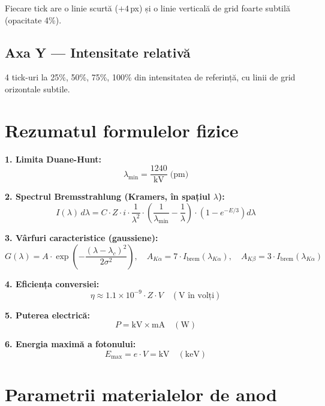 \documentclass[12pt,a4paper]{article}
\begin{document}
Fiecare tick are o linie scurtă ($+4$\,px) și o linie verticală de grid foarte subtilă (opacitate 4\%).

\subsection{Axa Y — Intensitate relativă}

4 tick-uri la 25\%, 50\%, 75\%, 100\% din intensitatea de referință, cu linii de grid orizontale subtile.


\section{Rezumatul formulelor fizice}

\begin{tcolorbox}[colback=codeblue!5, colframe=codeblue, title=Formulele cheie ale simulatorului]

\textbf{1. Limita Duane-Hunt:}
\[
    \lambda_{\min} = \frac{1240}{\text{kV}} \;\text{(pm)}
\]

\textbf{2. Spectrul Bremsstrahlung (Kramers, în spațiul $\lambda$):}
\[
    I(\lambda)\,d\lambda = C \cdot Z \cdot i \cdot \frac{1}{\lambda^2} \cdot \left(\frac{1}{\lambda_{\min}} - \frac{1}{\lambda}\right) \cdot \left(1 - e^{-E/3}\right) d\lambda
\]

\textbf{3. Vârfuri caracteristice (gaussiene):}
\[
    G(\lambda) = A \cdot \exp\!\left(-\frac{(\lambda - \lambda_c)^2}{2\sigma^2}\right), \quad A_{K\alpha} = 7 \cdot I_{\text{brem}}(\lambda_{K\alpha}), \quad A_{K\beta} = 3 \cdot I_{\text{brem}}(\lambda_{K\alpha})
\]

\textbf{4. Eficiența conversiei:}
\[
    \eta \approx 1.1 \times 10^{-9} \cdot Z \cdot V \quad (\text{V în volți})
\]

\textbf{5. Puterea electrică:}
\[
    P = \text{kV} \times \text{mA} \quad (\text{W})
\]

\textbf{6. Energia maximă a fotonului:}
\[
    E_{\max} = e \cdot V = \text{kV} \quad (\text{keV})
\]

\end{tcolorbox}


\section{Parametrii materialelor de anod}
\end{document}
